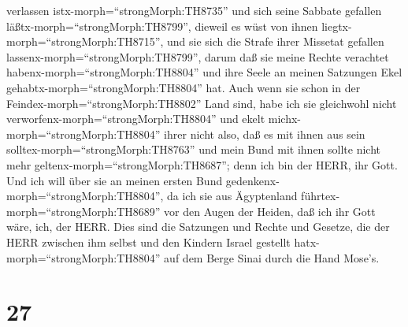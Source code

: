 verlassen istx-morph=``strongMorph:TH8735'' und sich seine Sabbate
gefallen läßtx-morph=``strongMorph:TH8799'', dieweil es wüst von ihnen
liegtx-morph=``strongMorph:TH8715'', und sie sich die Strafe ihrer
Missetat gefallen lassenx-morph=``strongMorph:TH8799'', darum daß sie
meine Rechte verachtet habenx-morph=``strongMorph:TH8804'' und ihre
Seele an meinen Satzungen Ekel gehabtx-morph=``strongMorph:TH8804'' hat.
 Auch wenn sie schon in der
Feindex-morph=``strongMorph:TH8802'' Land sind, habe ich sie gleichwohl
nicht verworfenx-morph=``strongMorph:TH8804'' und ekelt
michx-morph=``strongMorph:TH8804'' ihrer nicht also, daß es mit ihnen
aus sein solltex-morph=``strongMorph:TH8763'' und mein Bund mit ihnen
sollte nicht mehr geltenx-morph=``strongMorph:TH8687''; denn ich bin der
HERR, ihr Gott.  Und ich will über sie an meinen ersten
Bund gedenkenx-morph=``strongMorph:TH8804'', da ich sie aus Ägyptenland
führtex-morph=``strongMorph:TH8689'' vor den Augen der Heiden, daß ich
ihr Gott wäre, ich, der HERR.  Dies sind die Satzungen und
Rechte und Gesetze, die der HERR zwischen ihm selbst und den Kindern
Israel gestellt hatx-morph=``strongMorph:TH8804'' auf dem Berge Sinai
durch die Hand Mose's.

\hypertarget{section-26}{%
\section{27}\label{section-26}}

